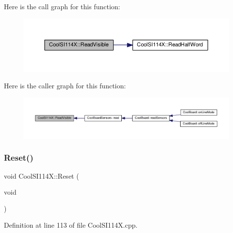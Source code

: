 Here is the call graph for this function\+:\nopagebreak
\begin{figure}[H]
\begin{center}
\leavevmode
\includegraphics[width=350pt]{class_cool_s_i114_x_a42e0e574256341443c647a4c0eda87d5_cgraph}
\end{center}
\end{figure}
Here is the caller graph for this function\+:\nopagebreak
\begin{figure}[H]
\begin{center}
\leavevmode
\includegraphics[width=350pt]{class_cool_s_i114_x_a42e0e574256341443c647a4c0eda87d5_icgraph}
\end{center}
\end{figure}
\mbox{\label{class_cool_s_i114_x_a9d9f9c9129c0c29ed497f8563f3dd823}} 
\subsubsection{\texorpdfstring{Reset()}{Reset()}}
{\footnotesize\ttfamily void Cool\+S\+I114\+X\+::\+Reset (\begin{DoxyParamCaption}\item[{void}]{ }\end{DoxyParamCaption})}



Definition at line 113 of file Cool\+S\+I114\+X.\+cpp.

